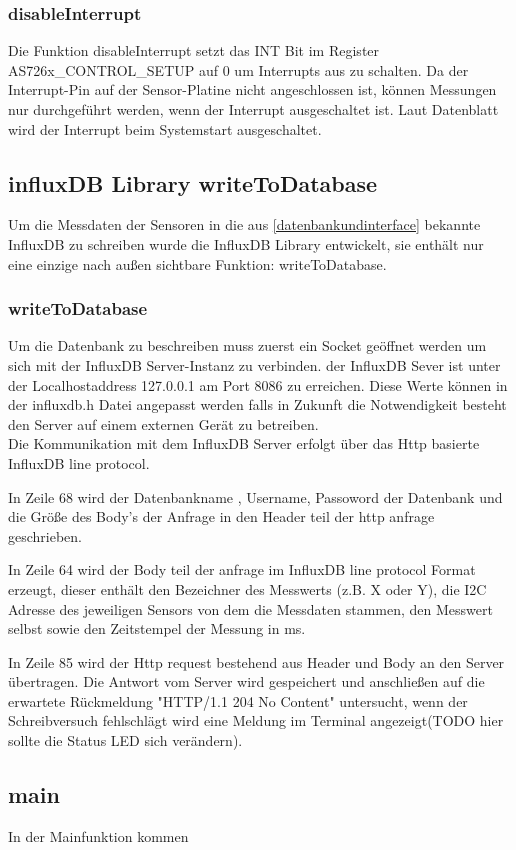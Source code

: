 \subsubsection{disableInterrupt}
Die Funktion disableInterrupt setzt das INT Bit im Register AS726x\_CONTROL\_SETUP auf 0 um Interrupts aus zu schalten.
Da der Interrupt-Pin auf der Sensor-Platine nicht angeschlossen ist, können Messungen nur durchgeführt werden, wenn der Interrupt ausgeschaltet ist.
Laut Datenblatt wird der Interrupt beim Systemstart ausgeschaltet.

\subsection{influxDB Library writeToDatabase}
Um die Messdaten der Sensoren in die aus \ref{datenbankundinterface} bekannte InfluxDB zu schreiben wurde die InfluxDB Library entwickelt, sie enthält nur eine einzige nach außen sichtbare Funktion: writeToDatabase.
\subsubsection{writeToDatabase}
Um die Datenbank zu beschreiben muss zuerst ein Socket geöffnet werden um sich mit der InfluxDB Server-Instanz  zu verbinden.
der InfluxDB Sever ist unter der Localhostaddress 127.0.0.1 am Port 8086 zu erreichen.
	Diese Werte können in der influxdb.h Datei angepasst werden falls in Zukunft die Notwendigkeit besteht den Server auf einem externen Gerät zu betreiben.\\
	Die Kommunikation mit dem InfluxDB Server erfolgt über das Http basierte InfluxDB line protocol.

	
	In Zeile 68 wird der Datenbankname , Username,  Passoword der Datenbank und die Größe des Body's der Anfrage in den Header teil der http anfrage geschrieben.
	
	In Zeile 64 wird der Body teil der anfrage im InfluxDB line protocol Format erzeugt, dieser enthält den Bezeichner des Messwerts (z.B. X oder Y), die I2C Adresse des jeweiligen Sensors von dem die Messdaten stammen, den Messwert selbst sowie den Zeitstempel der Messung in ms.
	
In Zeile 85 wird der Http request bestehend aus Header und Body an den Server übertragen.
Die Antwort vom Server wird gespeichert und anschließen auf die erwartete Rückmeldung "HTTP/1.1 204 No Content" untersucht, wenn der Schreibversuch fehlschlägt wird eine Meldung im Terminal angezeigt(TODO hier sollte die Status LED sich verändern).
\subsection{main}
In der Mainfunktion kommen 



